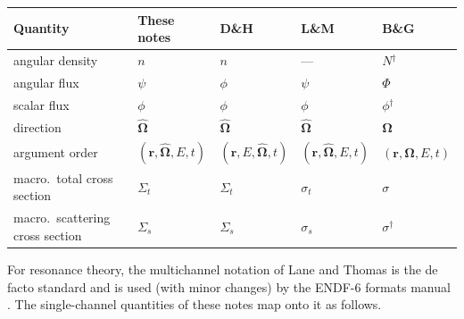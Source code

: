 
\begin{center}
 {\small
 \begin{tabular}{lllll}
  \toprule
   Quantity        & These notes & D\&H \cite{duderstadt1976nra} & L\&M \cite{lewis1993cmn} & B\&G \cite{bell1970nrt} \\
  \midrule
   angular density & $n$ & $n$ & --- & $N$$^\dagger$ \\
   angular flux    & $\psi$ & $\phi$ & $\psi$ & $\Phi$ \\
   scalar flux     & $\phi$ & $\phi$ & $\phi$ & $\phi$$^\dagger$ \\
   direction       & $\hat{\bm{\Omega}}$ & $\hat{\bm{\Omega}}$ & $\hat{\bm{\Omega}}$ & $\mathbf{\Omega}$ \\
   argument order  & $(\mathbf{r},\hat{\bm{\Omega}},E,t)$ & $(\mathbf{r},E,\hat{\bm{\Omega}},t)$ & $(\mathbf{r},\hat{\bm{\Omega}},E,t)$ & $(\mathbf{r},\mathbf{\Omega},E,t)$ \\
   macro.\ total cross section & $\Sigma_t$ & $\Sigma_t$ & $\sigma_t$ & $\sigma$ \\
   macro.\ scattering cross section & $\Sigma_s$ & $\Sigma_s$ & $\sigma_s$ & $\sigma$$^\dagger$ \\
  \bottomrule
 \end{tabular}
 }
\end{center}

For resonance theory, the multichannel notation of Lane and Thomas \cite{lane1958rmt} is the de facto standard and is used (with minor changes) by the ENDF-6 formats manual \cite{trkov2018endf}.  The single-channel quantities of these notes map onto it as follows.

